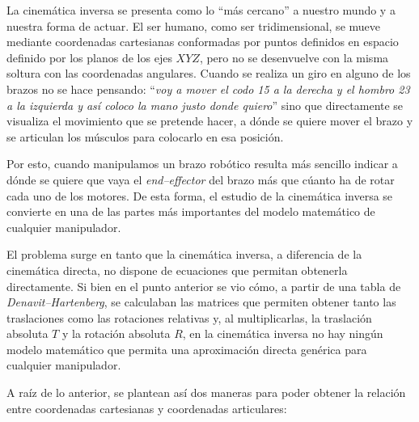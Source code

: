 La cinemática inversa se presenta como lo ``más cercano'' a nuestro mundo y a nuestra
forma de actuar. El ser humano, como ser tridimensional, se mueve mediante coordenadas
cartesianas conformadas por puntos definidos en espacio definido por los planos de los
ejes $XYZ$, pero no se desenvuelve con la misma soltura con las coordenadas angulares.
Cuando se realiza un giro en alguno de los brazos no se hace pensando: ``\textit{voy a mover el codo
    15\textdegree{} a la derecha y el hombro 23\textdegree{} a la izquierda y así coloco la
    mano justo donde quiero}'' sino que directamente se visualiza el movimiento que se pretende
hacer, a dónde se quiere mover el brazo y se articulan los músculos para
colocarlo en esa posición.

Por esto, cuando manipulamos un brazo robótico resulta más sencillo indicar a dónde
se quiere que vaya el \textit{end--effector} del brazo más que cúanto ha de rotar cada uno de los
motores. De esta forma, el estudio de la cinemática inversa se convierte en una de las
partes más importantes del modelo matemático de cualquier manipulador.

El problema surge en tanto que la cinemática inversa, a diferencia de la cinemática
directa, no dispone de ecuaciones que permitan obtenerla directamente. Si bien en el
punto anterior se vio cómo, a partir de una tabla de \textit{Denavit--Hartenberg},
se calculaban las matrices que permiten obtener tanto las traslaciones como las rotaciones
relativas y, al multiplicarlas, la traslación absoluta $T$ y la rotación absoluta $R$,
en la cinemática inversa no hay ningún modelo matemático que permita una aproximación
directa genérica para cualquier manipulador.

A raíz de lo anterior, se plantean así dos maneras para poder obtener la relación entre
coordenadas cartesianas y coordenadas articulares:


